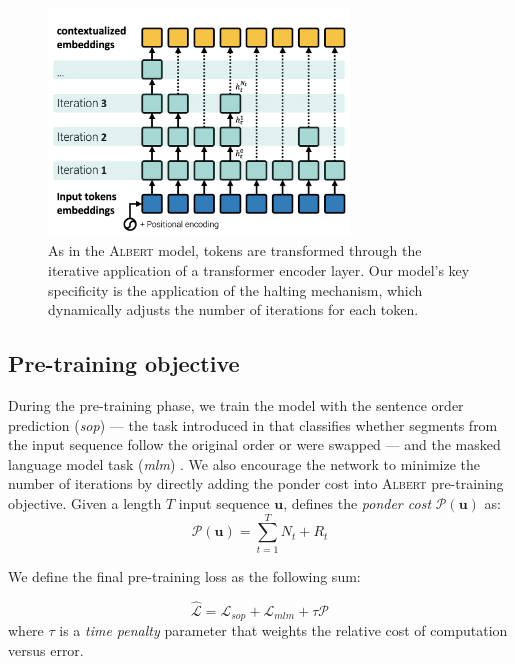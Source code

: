 \begin{figure}[!htb]
\begin{center}
\includegraphics[width=8cm]{images/model-3.png}
\end{center}
\caption{As in the \textsc{Albert}  model, tokens are transformed through the iterative application of a transformer encoder layer. Our model's key specificity is the application of the halting mechanism, which dynamically adjusts the number of iterations for each token.
}
\end{figure}

\subsection{Pre-training objective}

During the pre-training phase, we train the model with the sentence order prediction (\textit{sop}) — the task introduced in \textcite{lan_20} that classifies whether segments from the input sequence follow the original order or were swapped — and the masked language model task (\textit{mlm}) \parencite{devlin_19}. We also encourage the network to minimize the number of iterations by directly adding the ponder cost into \textsc{Albert}  pre-training objective. Given a length $T$ input sequence $\textbf{u}$,  \textcite{graves_16} defines the \emph{ponder cost} $\mathcal{P}(\textbf{u})$ as:
\begin{equation}
\mathcal{P}(\textbf{u}) = \sum_{t=1}^T N_{t} + R_t \label{eq:ponder-cost}
\end{equation}

We define the final pre-training loss as the following sum:

\begin{equation}
\hat{\mathcal{L}} = \mathcal{L}_{sop} + \mathcal{L}_{mlm} + \tau \mathcal{P} \label{eq:ponder-loss}
\end{equation}
where $\tau$ is a \emph{time penalty} parameter that weights the relative cost of computation versus error.

